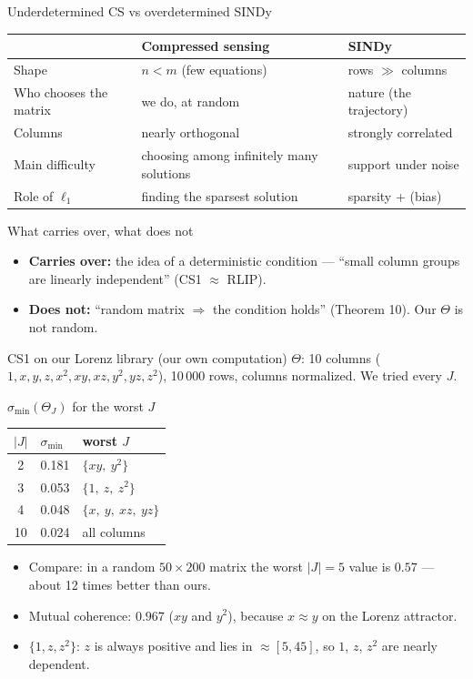 \documentclass[aspectratio=169,11pt]{beamer}
\begin{document}
\begin{frame}{Underdetermined CS vs overdetermined SINDy}
  \centering\small
  \begin{tabular}{@{}p{3.4cm}p{5cm}p{5cm}@{}}
    \toprule
    & \textbf{Compressed sensing} & \textbf{SINDy} \\
    \midrule
    Shape & $n<m$ (few equations) & rows $\gg$ columns \\
    Who chooses the matrix & we do, at random & nature (the trajectory) \\
    Columns & nearly orthogonal & strongly correlated \\
    Main difficulty & choosing among infinitely many solutions & support under noise \\
    Role of $\ell_1$ & finding the sparsest solution & sparsity + (bias) \\
    \bottomrule
  \end{tabular}
  \medskip

  \raggedright
  \begin{block}{What carries over, what does not}
    \begin{itemize}
      \item \textbf{Carries over:} the idea of a deterministic condition --- ``small column groups are linearly independent'' (CS1 $\approx$ RLIP).
      \item \textbf{Does not:} ``random matrix $\Rightarrow$ the condition holds'' (Theorem 10). Our $\Theta$ is not random.
    \end{itemize}
  \end{block}
\end{frame}

\begin{frame}{CS1 on our Lorenz library (our own computation)}
  $\Theta$: 10 columns ($1,x,y,z,x^2,xy,xz,y^2,yz,z^2$), 10\,000 rows, columns normalized. We tried every $J$.
  \begin{exampleblock}{$\sigma_{\min}(\Theta_J)$ for the worst $J$}
    \centering
    \begin{tabular}{@{}cll@{}}
      \toprule
      $|J|$ & $\sigma_{\min}$ & worst $J$ \\
      \midrule
      2 & 0.181 & $\{xy,\ y^2\}$ \\
      3 & 0.053 & $\{1,\ z,\ z^2\}$ \\
      4 & 0.048 & $\{x,\ y,\ xz,\ yz\}$ \\
      10 & 0.024 & all columns \\
      \bottomrule
    \end{tabular}
  \end{exampleblock}
  \begin{itemize}
    \item Compare: in a random $50\times200$ matrix the worst $|J|=5$ value is $0.57$ --- about 12 times better than ours.
    \item Mutual coherence: $0.967$ ($xy$ and $y^2$), because $x\approx y$ on the Lorenz attractor.
    \item $\{1,z,z^2\}$: $z$ is always positive and lies in $\approx[5,45]$, so $1$, $z$, $z^2$ are nearly dependent.
  \end{itemize}
\end{frame}
\end{document}
